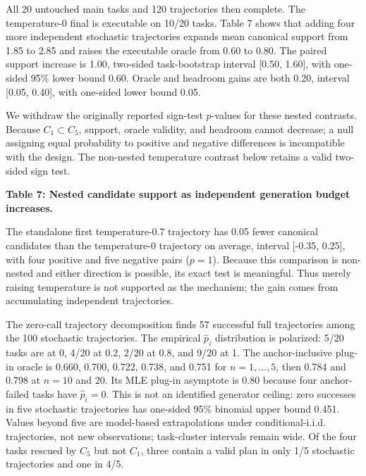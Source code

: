 \documentclass{article}
\begin{document}
All 20 untouched main tasks and 120 trajectories then complete. The temperature-0 final is executable on 10/20 tasks. Table 7 shows that adding four more independent stochastic trajectories expands mean canonical support from 1.85 to 2.85 and raises the executable oracle from 0.60 to 0.80. The paired support increase is 1.00, two-sided task-bootstrap interval [0.50, 1.60], with one-sided 95\% lower bound 0.60. Oracle and headroom gains are both 0.20, interval [0.05, 0.40], with one-sided lower bound 0.05.

We withdraw the originally reported sign-test \(p\)-values for these nested contrasts. Because \(C_1\subset C_5\), support, oracle validity, and headroom cannot decrease; a null assigning equal probability to positive and negative differences is incompatible with the design. The non-nested temperature contrast below retains a valid two-sided sign test.

\textbf{Table 7: Nested candidate support as independent generation budget increases.}

\begin{center}
\end{center}

The standalone first temperature-0.7 trajectory has 0.05 fewer canonical candidates than the temperature-0 trajectory on average, interval [-0.35, 0.25], with four positive and five negative pairs (\(p=1\)). Because this comparison is non-nested and either direction is possible, its exact test is meaningful. Thus merely raising temperature is not supported as the mechanism; the gain comes from accumulating independent trajectories.

The zero-call trajectory decomposition finds 57 successful full trajectories among the 100 stochastic trajectories. The empirical \(\widehat p_i\) distribution is polarized: 5/20 tasks are at 0, 4/20 at 0.2, 2/20 at 0.8, and 9/20 at 1. The anchor-inclusive plug-in oracle is 0.660, 0.700, 0.722, 0.738, and 0.751 for \(n=1,\ldots,5\), then 0.784 and 0.798 at \(n=10\) and \(20\). Its MLE plug-in asymptote is 0.80 because four anchor-failed tasks have \(\widehat p_i=0\). This is not an identified generator ceiling: zero successes in five stochastic trajectories has one-sided 95\% binomial upper bound 0.451. Values beyond five are model-based extrapolations under conditional-i.i.d. trajectories, not new observations; task-cluster intervals remain wide. Of the four tasks rescued by \(C_5\) but not \(C_1\), three contain a valid plan in only 1/5 stochastic trajectories and one in 4/5.
\end{document}
